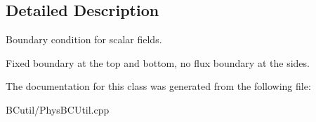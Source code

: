 \subsection{Detailed Description}
Boundary condition for scalar fields. 

Fixed boundary at the top and bottom, no flux boundary at the sides. 

The documentation for this class was generated from the following file\-:\begin{DoxyCompactItemize}
\item 
B\-Cutil/Phys\-B\-C\-Util.\-cpp\end{DoxyCompactItemize}
